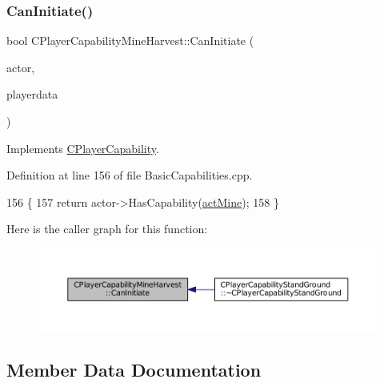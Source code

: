\subsubsection{\texorpdfstring{Can\+Initiate()}{CanInitiate()}}
{\footnotesize\ttfamily bool C\+Player\+Capability\+Mine\+Harvest\+::\+Can\+Initiate (\begin{DoxyParamCaption}\item[{std\+::shared\+\_\+ptr$<$ \hyperlink{classCPlayerAsset}{C\+Player\+Asset} $>$}]{actor,  }\item[{std\+::shared\+\_\+ptr$<$ \hyperlink{classCPlayerData}{C\+Player\+Data} $>$}]{playerdata }\end{DoxyParamCaption})\hspace{0.3cm}{\ttfamily [virtual]}}



Implements \hyperlink{classCPlayerCapability_aa83b1e1fcaff2985c378132d679154ea}{C\+Player\+Capability}.



Definition at line 156 of file Basic\+Capabilities.\+cpp.


\begin{DoxyCode}
156                                                                                                            
                     \{
157     \textcolor{keywordflow}{return} actor->HasCapability(\hyperlink{GameDataTypes_8h_a35b98ce26aca678b03c6f9f76e4778cea2e0db284fd05caa56e3867c661ccdd8b}{actMine});
158 \}
\end{DoxyCode}
Here is the caller graph for this function\+:\nopagebreak
\begin{figure}[H]
\begin{center}
\leavevmode
\includegraphics[width=350pt]{classCPlayerCapabilityMineHarvest_a37944eb249559f1246348b47e3f24dee_icgraph}
\end{center}
\end{figure}


\subsection{Member Data Documentation}
\hypertarget{classCPlayerCapabilityMineHarvest_aa493df2fd0bbae27ce1b7c4e2250a28c}{}\label{classCPlayerCapabilityMineHarvest_aa493df2fd0bbae27ce1b7c4e2250a28c} 
